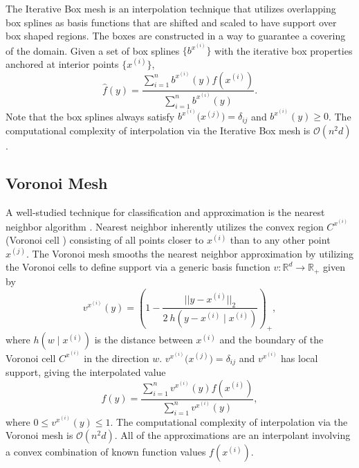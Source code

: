 \documentclass[sigconf]{acmart}
\begin{document}
The Iterative Box mesh is an interpolation technique that utilizes overlapping box splines \cite{de2013box} as basis functions that are shifted and scaled to have support over box shaped regions. The boxes are constructed in a way to guarantee a covering of the domain. Given a set of box splines $\bigl\{b^{x^{(i)}}\bigr\}$ with the iterative box properties anchored at interior points $\bigl\{x^{(i)}\bigr\}$,
$$ \hat f(y) = \frac{\sum\limits_{i=1}^n b^{x^{(i)}}(y) f(x^{(i)})}{\sum\limits_{i=1}^n b^{x^{(i)}}(y)}. $$
Note that the box splines always satisfy $b^{x^{(i)}}\bigl(x^{(j)}\bigr) = \delta_{ij}$ and $b^{x^{(i)}}(y) \geq 0$. The computational complexity of interpolation via the Iterative Box mesh is $\mathcal{O}(n^2 d)$.

\subsection{Voronoi Mesh}
\label{sec:voronoi_mesh}

A well-studied technique for classification and approximation is the nearest neighbor algorithm \cite{cover1967nearest}. Nearest neighbor inherently utilizes the convex region $C^{x^{(i)}}$ (Voronoi cell \cite{dirichlet1850reduction}) consisting of all points closer to $x^{(i)}$ than to any other point $x^{(j)}$. The Voronoi mesh smooths the nearest neighbor approximation by utilizing the Voronoi cells to define support via a generic basis function $v: \mathbb{R}^d \rightarrow \mathbb{R}_+$ given by
$$ v^{x^{(i)}}(y) = \left(1 - \frac{||y - x^{(i)}||_2}{2 \ h(y - x^{(i)} \mid x^{(i)})} \right)_+, $$
where $h(w \mid x^{(i)})$ is the distance between $x^{(i)}$ and the boundary of the Voronoi cell $C^{x^{(i)}}$ in the direction $w$. $v^{x^{(i)}}\bigl(x^{(j)}\bigr) = \delta_{ij}$ and $v^{x^{(i)}}$ has local support, giving the interpolated value
$$ f(y) = \frac{\sum_{i=1}^n v^{x^{(i)}}(y) f(x^{(i)})}{\sum_{i=1}^n v^{x^{(i)}}(y)}, $$
where $0 \leq v^{x^{(i)}}(y) \leq 1$. The computational complexity of interpolation via the Voronoi mesh is $\mathcal{O}(n^2 d)$. All of the approximations are an interpolant involving a convex combination of known function values $f(x^{(i)})$.
\end{document}
